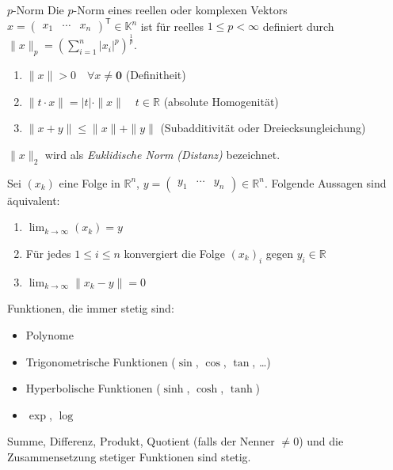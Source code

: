 \documentclass[a4paper,10pt]{article}
\def\R{\mathbb{R}}
\def\K{\mathbb{K}}
\begin{document}
\begin{mainbox}{\( p \)-Norm}
    Die \( p \)-Norm eines reellen oder komplexen Vektors \( x = \begin{pmatrix}
        x_1 & \cdots & x_n
    \end{pmatrix}^\mathsf{T} \in \K^n \) ist für reelles \( 1 \leq p < \infty \) definiert durch \( \| x \|_p = (\sum_{i=1}^n |x_i|^p)^\frac{1}{p} \).
\end{mainbox}

\begin{enumerate}
    \item \( \| x \| > 0 \quad \forall x \neq \mathbf{0} \) (Definitheit)
    \item \( \| t \cdot x \| = |t| \cdot \| x \| \quad t \in \R \) (absolute Homogenität)
    \item \( \| x + y \| \leq \| x \| + \| y \| \) (Subadditivität oder Dreiecksungleichung)
\end{enumerate}

\( \| x \|_2 \) wird als \emph{Euklidische Norm (Distanz)} bezeichnet.

\begin{subbox}{}
    Sei \( (x_k) \) eine Folge in \( \R^n \), \( y = \begin{pmatrix}
        y_1 & \cdots & y_n
    \end{pmatrix} \in \R^n \). Folgende Aussagen sind äquivalent:
    \begin{enumerate}
        \item \( \lim_{k \to \infty} (x_k) = y \)
        \item Für jedes \( 1 \leq i \leq n \) konvergiert die Folge \( (x_k)_i \) gegen \( y_i \in \R \)
        \item \( \lim_{k \to \infty} \| x_k - y \| = 0 \)
    \end{enumerate}
\end{subbox}

Funktionen, die immer stetig sind:
\begin{itemize}
    \item Polynome
    \item Trigonometrische Funktionen (\( \sin \), \( \cos \), \( \tan \), \dots)
    \item Hyperbolische Funktionen (\( \sinh \), \( \cosh \), \( \tanh \))
    \item \( \exp \), \( \log \)
\end{itemize}
\begin{subbox}{}
    Summe, Differenz, Produkt, Quotient (falls der Nenner \( \neq 0 \)) und die Zusammensetzung stetiger Funktionen sind stetig.
\end{subbox}
\end{document}
